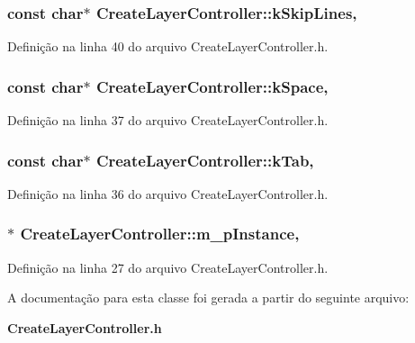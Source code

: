 \subsubsection[{k\+Skip\+Lines}]{\setlength{\rightskip}{0pt plus 5cm}const char$\ast$ Create\+Layer\+Controller\+::k\+Skip\+Lines\hspace{0.3cm}{\ttfamily [static]}, {\ttfamily [protected]}}\label{class_create_layer_controller_a30d3868b2e18a473c27c8ed84012df81}


Definição na linha 40 do arquivo Create\+Layer\+Controller.\+h.

\subsubsection[{k\+Space}]{\setlength{\rightskip}{0pt plus 5cm}const char$\ast$ Create\+Layer\+Controller\+::k\+Space\hspace{0.3cm}{\ttfamily [static]}, {\ttfamily [protected]}}\label{class_create_layer_controller_a89f8bf28b56ed52a50d53325d183a13f}


Definição na linha 37 do arquivo Create\+Layer\+Controller.\+h.

\subsubsection[{k\+Tab}]{\setlength{\rightskip}{0pt plus 5cm}const char$\ast$ Create\+Layer\+Controller\+::k\+Tab\hspace{0.3cm}{\ttfamily [static]}, {\ttfamily [protected]}}\label{class_create_layer_controller_aac5f0a49f88f74eb3e94418ff443c0d3}


Definição na linha 36 do arquivo Create\+Layer\+Controller.\+h.

\subsubsection[{m\+\_\+p\+Instance}]{$\ast$ Create\+Layer\+Controller\+::m\+\_\+p\+Instance\hspace{0.3cm}{\ttfamily [static]}, {\ttfamily [protected]}}\label{class_create_layer_controller_af9c3475d3f524f60c765b6d30a3e6d3b}


Definição na linha 27 do arquivo Create\+Layer\+Controller.\+h.



A documentação para esta classe foi gerada a partir do seguinte arquivo\+:\begin{DoxyCompactItemize}
\item 
{\bf Create\+Layer\+Controller.\+h}\end{DoxyCompactItemize}
